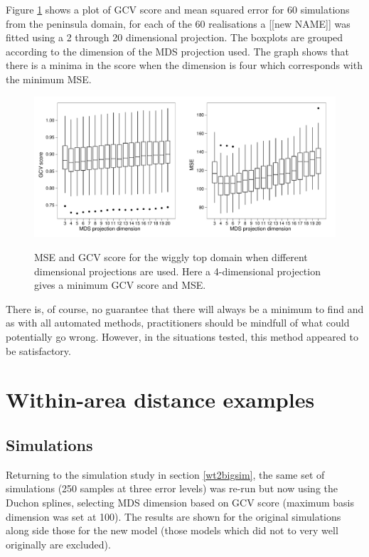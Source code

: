 Figure \ref{wt2-gcv-projdim-boxplot} shows a plot of GCV score and mean squared error for 60 simulations from the peninsula domain, for each of the 60 realisations a [[new NAME]] was fitted using a 2 through 20 dimensional projection. The boxplots are grouped according to the dimension of the MDS projection used. The graph shows that there is a minima in the score when the dimension is four which corresponds with the minimum MSE.

\begin{figure}
\centering
\includegraphics[width=6in]{mds/figs/wt2-gcv-projdim-boxplot.pdf} \\
\caption{MSE and GCV score for the wiggly top domain when different dimensional projections are used. Here a 4-dimensional projection gives a minimum GCV score and MSE.}
\label{wt2-gcv-projdim-boxplot}
\end{figure}

There is, of course, no guarantee that there will always be a minimum to find and as with all automated methods, practitioners should be mindfull of what could potentially go wrong. However, in the situations tested, this method appeared to be satisfactory.

\section{Within-area distance examples}
\label{gds-wad-examples}
\subsection{Simulations}

Returning to the simulation study in section \ref{wt2bigsim}, the same set of simulations (250 samples at three error levels) was re-run but now using the Duchon splines, selecting MDS dimension based on GCV score (maximum basis dimension was set at 100). The results are shown for the original simulations along side those for the new model (those models which did not to very well originally are excluded).


